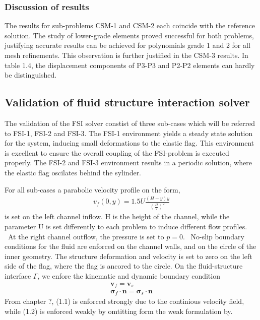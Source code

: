 \subsubsection*{Discussion of results}
The results for sub-problems CSM-1 and CSM-2 each coincide with the reference solution. The study of lower-grade elements proved successful for both problems, justifying accurate results can be achieved for polynomials grade 1 and 2 for all mesh refinements. This observation is further justified in the CSM-3 results. In table 1.4, the  displacement components of P3-P3 and P2-P2 elements can hardly be distinguished.


\newpage
\subsection{Validation of fluid structure interaction solver}
The validation of the FSI solver constist of three sub-cases which will be referred to FSI-1, FSI-2 and FSI-3. The FSI-1 environment yields a steady state solution for the system, inducing small deformations to the elastic flag. This environment is excellent to ensure the overall coupling of the FSI-problem is executed properly. The FSI-2 and FSI-3 environment results in a periodic solution, where the elastic flag oscilates behind the sylinder.


 For all sub-cases
a parabolic velocity profile on the form,
\begin{align*}
v_f(0, y) = 1.5 U\frac{(H -y)y}{(\frac{H}{2})^2}
\end{align*}
is set on the left channel inflow. H is the height of the channel, while the parameter U is set differently to each problem to induce different flow profiles. \
At the right channel outflow, the pressure is set to $p = 0$. \
No-slip boundary conditions for the fluid are enforced on the channel walls, and on the circle of the inner geometry.
The structure deformation and velocity is set to zero on the left side of the flag, where the flag is ancored to the circle. On the fluid-structure interface $\Gamma$, we enfore the kinematic and dynamic boundary condition
\begin{align}
\mathbf{v}_f = \mathbf{v}_s \\
\mathbf{\sigma}_f \cdot \mathbf{n} = \mathbf{\sigma}_s \cdot \mathbf{n}
\end{align}
From chapter ?,  (1.1) is enforced strongly due to the continious velocity field, while (1.2) is enforced weakly by omtitting form the weak formulation by.



